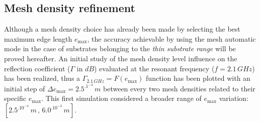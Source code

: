 \documentclass[12pt,a4paper]{article}
\begin{document}
{\begin{multicols}{2}
\subsection*{Mesh density refinement}
Although a mesh density choice has already been made by selecting the best maximum edge length $e_{\max}$, the accuracy achievable by using the mesh automatic mode in the case of substrates belonging to the  \emph{thin substrate range} will be proved hereafter. An initial study of the mesh density level influence on the reflection coefficient ($\Gamma$ in $dB$) evaluated at the resonant frequency ($f=2.1\,GHz$) has been realized, thus a  $\Gamma_{2.1\,GHz}=F(e_{\max})$ function has been plotted with an initial step of $\Delta e_{\max} = 2.5^.1^{-4}\,m$ between every two mesh densities related to their specific $e_{\max}$. This first simulation considered a broader range of $e_{\max}$ variation: $[2.5^.10^{-4}\,m\,,\,6.0^.10^{-4}\,m]$. 

\indent 


\end{multicols}}
\end{document}
